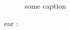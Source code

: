 \begin{figure}[bt]                                                                                                                                       
\centering                                                                                                                                               
\def\svgwidth{\textwidth}                                                                                                                            
\fontsize{8pt}{8pt}\selectfont%
                                                                                                                      
    \caption{some caption
    \label{fig:short}}                                                                                                                                   
\end{figure}    
ear
:
